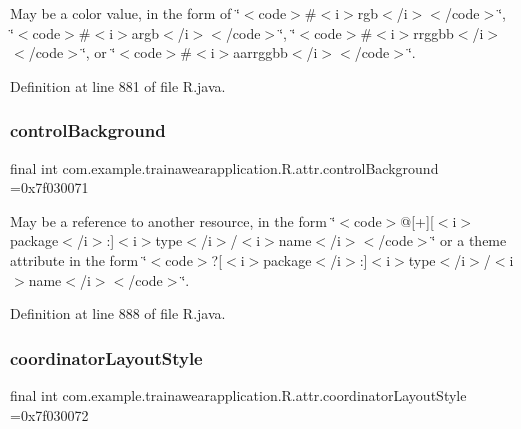 May be a color value, in the form of \char`\"{}$<$code$>$\#$<$i$>$rgb$<$/i$>$$<$/code$>$\char`\"{}, \char`\"{}$<$code$>$\#$<$i$>$argb$<$/i$>$$<$/code$>$\char`\"{}, \char`\"{}$<$code$>$\#$<$i$>$rrggbb$<$/i$>$$<$/code$>$\char`\"{}, or \char`\"{}$<$code$>$\#$<$i$>$aarrggbb$<$/i$>$$<$/code$>$\char`\"{}. 

Definition at line 881 of file R.\+java.

\mbox{\label{classcom_1_1example_1_1trainawearapplication_1_1_r_1_1attr_ad225abaef3ccfc704fd2dedde613c85d}} 
\subsubsection{\texorpdfstring{controlBackground}{controlBackground}}
{\footnotesize\ttfamily final int com.\+example.\+trainawearapplication.\+R.\+attr.\+control\+Background =0x7f030071\hspace{0.3cm}{\ttfamily [static]}}

May be a reference to another resource, in the form \char`\"{}$<$code$>$@\mbox{[}+\mbox{]}\mbox{[}$<$i$>$package$<$/i$>$\+:\mbox{]}$<$i$>$type$<$/i$>$/$<$i$>$name$<$/i$>$$<$/code$>$\char`\"{} or a theme attribute in the form \char`\"{}$<$code$>$?\mbox{[}$<$i$>$package$<$/i$>$\+:\mbox{]}$<$i$>$type$<$/i$>$/$<$i$>$name$<$/i$>$$<$/code$>$\char`\"{}. 

Definition at line 888 of file R.\+java.

\mbox{\label{classcom_1_1example_1_1trainawearapplication_1_1_r_1_1attr_a685b92bfe975ad1b8db7f44e2c3634cf}} 
\subsubsection{\texorpdfstring{coordinatorLayoutStyle}{coordinatorLayoutStyle}}
{\footnotesize\ttfamily final int com.\+example.\+trainawearapplication.\+R.\+attr.\+coordinator\+Layout\+Style =0x7f030072\hspace{0.3cm}{\ttfamily [static]}}

